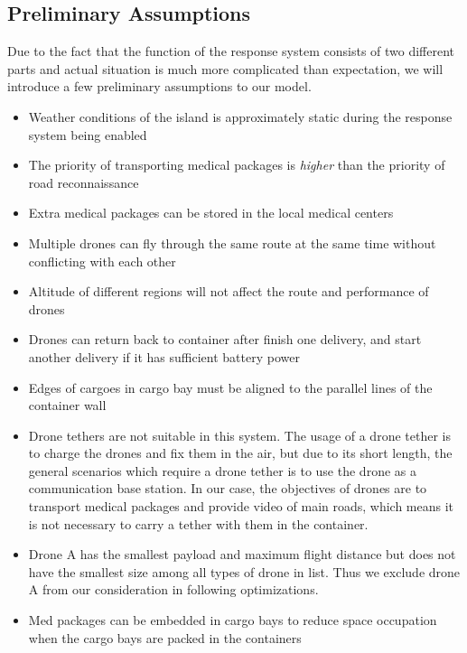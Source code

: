 \documentclass[12pt]{article}
\begin{document}
		\subsection{Preliminary Assumptions}
		Due to the fact that the function of the response system consists of two different parts and actual situation is much more complicated than expectation, we will introduce a few preliminary assumptions to our model.
		\begin{itemize}
			\item Weather conditions of the island is approximately static during the response system being enabled 
			\item The priority of transporting medical packages is \textit{higher} than the priority of road reconnaissance
			\item Extra medical packages can be stored in the local medical centers 
			\item Multiple drones can fly through the same route at the same time without conflicting with each other
			\item Altitude of different regions will not affect the route and performance of drones
			\item Drones can return back to container after finish one delivery, and start another delivery if it has sufficient battery power
			\item Edges of cargoes in cargo bay must be aligned to the parallel lines of the container wall
			\item Drone tethers are not suitable in this system. The usage of a drone tether is to charge the drones and fix them in the air, but due to its short length, the general scenarios which require a drone tether is to use the drone as a communication base station. In our case, the objectives of drones are to transport medical packages and provide video of main roads, which means it is not necessary to carry a tether with them in the container. 
			\item Drone A has the smallest payload and maximum flight distance but does not have the smallest size among all types of drone in list. Thus we exclude drone A from our consideration in following optimizations. 
			\item Med packages can be embedded in cargo bays to reduce space occupation when the cargo bays are packed in the containers
		\end{itemize}
\end{document}
